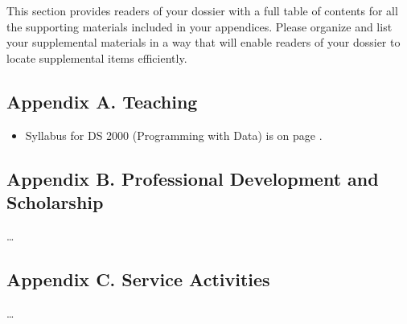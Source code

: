 This section provides readers of your dossier with a full table of contents for all the supporting materials included in your appendices. 
Please organize and list your supplemental materials in a way that will enable readers of your dossier to locate supplemental items efficiently.

\subsection*{Appendix A. Teaching}
\begin{itemize}
    \item Syllabus for DS 2000 (Programming with Data) is on page \pageref{syllabus-ds2000}.
\end{itemize}

\subsection*{Appendix B. Professional Development and Scholarship}
\ldots

\subsection*{Appendix C. Service Activities}
\ldots
